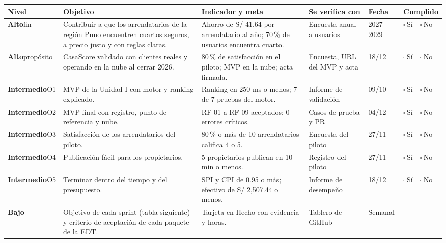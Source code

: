\documentclass[11pt,a4paper]{article}
\newcommand{\marca}{{\Large$\square$}\,{\scriptsize Sí}\ \ {\Large$\square$}\,{\scriptsize No}}
\begin{document}
\vspace{0.1cm}
{\footnotesize
\setlength{\tabcolsep}{3pt}
\noindent\begin{tabularx}{\textwidth}{@{}P{1.75cm} L P{3.4cm} P{2.1cm} C{1.0cm} C{1.9cm}@{}}
\toprule
{}
\textbf{Nivel} & \textbf{Objetivo} & \textbf{Indicador y meta} & \textbf{Se verifica con} & \textbf{Fecha} & \textbf{Cumplido} \\
\midrule
{}\textbf{Alto}\newline fin & Contribuir a que los arrendatarios de la región Puno encuentren cuartos seguros, a precio justo y con reglas claras. & Ahorro de S/ 41.64 por arrendatario al año; 70\,\% de usuarios encuentra cuarto. & Encuesta anual a usuarios & 2027--2029 & \marca \\
\textbf{Alto}\newline propósito & CasaScore validado con clientes reales y operando en la nube al cerrar 2026. & 80\,\% de satisfacción en el piloto; MVP en la nube; acta firmada. & Encuesta, URL del MVP y acta & 18/12 & \marca \\
\midrule
\textbf{Intermedio}\newline O1 & MVP de la Unidad I con motor y ranking explicado. & Ranking en 250 ms o menos; 7 de 7 pruebas del motor. & Informe de validación & 09/10 & \marca \\
\textbf{Intermedio}\newline O2 & MVP final con registro, punto de referencia y nube. & RF-01 a RF-09 aceptados; 0 errores críticos. & Casos de prueba y PR & 04/12 & \marca \\
\textbf{Intermedio}\newline O3 & Satisfacción de los arrendatarios del piloto. & 80\,\% o más de 10 arrendatarios califica 4 o 5. & Encuesta del piloto & 27/11 & \marca \\
\textbf{Intermedio}\newline O4 & Publicación fácil para los propietarios. & 5 propietarios publican en 10 min o menos. & Registro del piloto & 27/11 & \marca \\
\textbf{Intermedio}\newline O5 & Terminar dentro del tiempo y del presupuesto. & SPI y CPI de 0.95 o más; efectivo de S/ 2,507.44 o menos. & Informe de desempeño & 18/12 & \marca \\
\midrule
\textbf{Bajo} & Objetivo de cada sprint (tabla siguiente) y criterio de aceptación de cada paquete de la EDT. & Tarjeta en Hecho con evidencia y horas. & Tablero de GitHub & Semanal & -- \\
\bottomrule
\end{tabularx}
}
\end{document}
